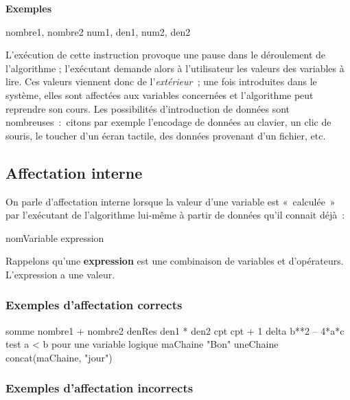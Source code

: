 			{\bfseries Exemples}
			
			\begin{Pseudocode}
			\Read nombre1, nombre2
			\Read num1, den1, num2, den2
			\end{Pseudocode}
			
			L’exécution de cette instruction provoque une
			pause dans le déroulement de l’algorithme ; 
			l’exécutant demande alors à l’utilisateur 
			les valeurs des variables à lire. 
			Ces valeurs viennent donc de l’\textit{extérieur~}; 
			une fois introduites dans le système,
			elles sont affectées aux variables concernées 
			et l’algorithme peut reprendre son cours. 
			Les possibilités d’introduction de données 
			sont nombreuses~:~citons par exemple l’encodage de
			données au clavier, un clic de souris, le toucher d’un
			écran tactile, des données provenant d’un fichier, etc.

		\subsection{Affectation interne }

			On parle d’affectation interne lorsque la valeur d’une variable est
			«~calculée~» par l’exécutant de l’algorithme lui-même à partir de
			données qu’il connait déjà~:

			\begin{Pseudocode}
			\Let nomVariable \Gets expression
			\end{Pseudocode}
			
			Rappelons qu’une \textbf{expression} 
			est une combinaison de variables et
			d’opérateurs. L’expression a une valeur.
			
			\subsubsection*{Exemples d’affectation corrects}
			
			\begin{Pseudocode}
			\Let somme \Gets nombre1 + nombre2
			\Let denRes \Gets den1 * den2
			\Let cpt \Gets cpt + 1
			\Let delta \Gets b**2 – 4*a*c
			\Let test \Gets a < b \RComment pour une variable logique
			\Let maChaine \Gets "Bon"
			\Let uneChaine \Gets concat(maChaine, "jour")
			\end{Pseudocode}
			
			\subsubsection*{Exemples d’affectation incorrects}
			
